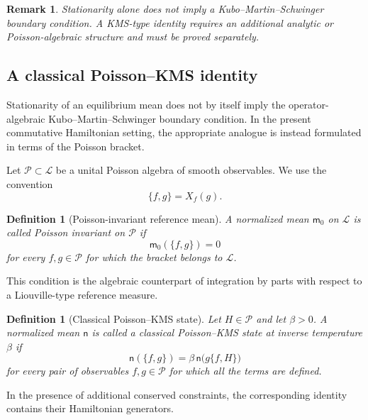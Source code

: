 \documentclass[11pt,reqno]{amsart}
\newtheorem{Definition}[Theorem]{Definition}
\newtheorem{rem}[Theorem]{Remark}
\begin{document}
\begin{rem}
Stationarity alone does not imply a Kubo--Martin--Schwinger boundary
condition. A KMS-type identity requires an additional analytic or
Poisson-algebraic structure and must be proved separately.
\end{rem}

\subsection{A classical Poisson--KMS identity}
\label{subsec:poisson-kms}

Stationarity of an equilibrium mean does not by itself imply the
operator-algebraic Kubo--Martin--Schwinger boundary condition. In the
present commutative Hamiltonian setting, the appropriate analogue is
instead formulated in terms of the Poisson bracket.

Let $\mathcal P\subset\mathcal L$ be a unital Poisson algebra of smooth
observables. We use the convention
\[
\{f,g\}=X_f(g).
\]

\begin{Definition}[Poisson-invariant reference mean]
\label{def:poisson-invariant-mean}
A normalized mean $\mathsf m_0$ on $\mathcal L$ is called
\emph{Poisson invariant on $\mathcal P$} if
\[
\mathsf m_0(\{f,g\})=0
\]
for every $f,g\in\mathcal P$ for which the bracket belongs to
$\mathcal L$.
\end{Definition}

This condition is the algebraic counterpart of integration by parts
with respect to a Liouville-type reference measure.

\begin{Definition}[Classical Poisson--KMS state]
\label{def:poisson-kms}
Let $H\in\mathcal P$ and let $\beta>0$. A normalized mean $\mathsf n$ is
called a \emph{classical Poisson--KMS state at inverse temperature
$\beta$} if
\[
\mathsf n(\{f,g\})
=
\beta\,\mathsf n\bigl(g\{f,H\}\bigr)
\]
for every pair of observables $f,g\in\mathcal P$ for which all the terms
are defined.
\end{Definition}

In the presence of additional conserved constraints, the corresponding
identity contains their Hamiltonian generators.
\end{document}
